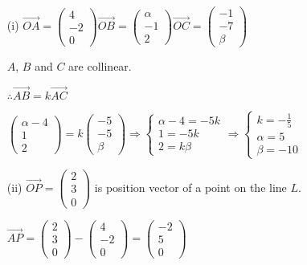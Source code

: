 \item {}
\begin{enumerate}
\item[(i)]  $\overrightarrow{OA}=\left(\begin{matrix}4\\
-2\\
0
\end{matrix}\right)\overrightarrow{OB}=\left(\begin{matrix}\alpha\\
-1\\
2
\end{matrix}\right)\overrightarrow{OC}=\left(\begin{matrix}-1\\
-7\\
\beta
\end{matrix}\right)$

$A$, $B$ and $C$ are collinear.

$\therefore\overrightarrow{AB}=k\overrightarrow{AC}$

$\left(\begin{matrix}\alpha-4\\
1\\
2
\end{matrix}\right)=k\left(\begin{matrix}-5\\
-5\\
\beta
\end{matrix}\right)\Rightarrow\left\{ \begin{matrix}\alpha-4=-5k\\
1=-5k\\
2=k\beta
\end{matrix}\right.\Rightarrow\left\{ \begin{matrix}k=-\frac{1}{5}\\
\alpha=5\\
\beta=-10
\end{matrix}\right.$
\item[(ii)]  $\overrightarrow{OP}=\left(\begin{matrix}2\\
3\\
0
\end{matrix}\right)$ is position vector of a point on the line $L$. 

$\overrightarrow{AP}=\left(\begin{matrix}2\\
3\\
0
\end{matrix}\right)-\left(\begin{matrix}4\\
-2\\
0
\end{matrix}\right)=\left(\begin{matrix}-2\\
5\\
0
\end{matrix}\right)$ 


\end{enumerate}
